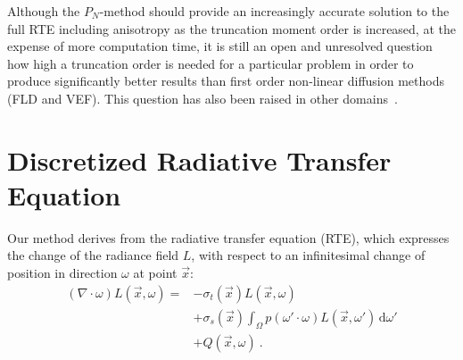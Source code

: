 \documentclass{egpubl}
\newcommand{\ud}{\,\mathrm{d}} %
\newcommand{\nocontentsline}[3]{}
\newcommand{\tocless}[2]{\bgroup\let\addcontentsline=\nocontentsline#1{#2}\egroup}
\begin{document}
Although the $P_N$-method should provide an increasingly accurate solution to the full RTE including anisotropy as the truncation moment order is increased, at the expense of more computation time, it is still an open and unresolved question how high a truncation order is needed for a particular problem in order to produce significantly better results than first order non-linear diffusion methods (FLD and VEF). This question has also been raised in other domains~\cite{Olson00}.






\newpage 

\tocless\section{Discretized Radiative Transfer Equation \label{sec:discretized_rte}}

Our method derives from the radiative transfer equation (RTE), which expresses the change of the radiance field $L$, with respect to an infinitesimal change of position in direction $\omega$ at point $\vec{x}$:
\begin{align}
\left(\nabla\cdot\omega\right)L\left(\vec{x}, \omega \right)
=&
-\sigma_t\left(\vec{x}\right) L\left(\vec{x}, \omega \right)\nonumber\\
&
+\sigma_s\left(\vec{x}\right) \int_{\Omega}
{
p\left(\omega'\cdot\omega\right)L\left(\vec{x}, \omega' \right)\ud\omega'
}\nonumber\\
&
+Q\left(\vec{x}, \omega\right)\nonumber
\  .
\label{eq:rte}
\end{align}
\end{document}
